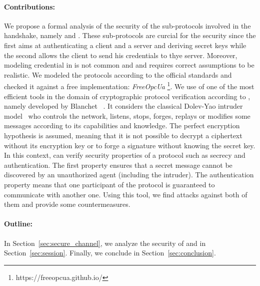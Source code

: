\paragraph{Contributions:}

We propose a formal analysis of the security of
the sub-protocols involved in the \opcua handshake, namely \opcua{}
\securechan and \opcua{} \session. 
These sub-protocols are curcial for the security since the first aims at
authenticating a client and a server and deriving secret keys while the second
allows the client to send his credentials to thye server.
Moreover, modeling credential in \proverif is not common and and requires
correct assumptions to be realistic.
We modeled the protocols according to the official \opcua standards and
checked it against a free implementation: {\em FreeOpcUa}
\footnote{https://freeopcua.github.io/}.
We use of one of the most efficient tools in the domain of
cryptographic protocol verification according to \cite{LP15},
namely \proverif developed by Blanchet \etal~\cite{Bla01}. 
It considers the classical Dolev-Yao intruder model~\cite{DY81} who
controls the network, listens, stops, forges,
replays or modifies some messages according to its capabilities and
knowledge.  The perfect encryption hypothesis is assumed, meaning that
it is not possible to decrypt a ciphertext without its encryption key
or to forge a signature without knowing the secret key.  In this
context, \proverif{} can verify security properties of a protocol such
as secrecy and authentication.  The first property ensures that a
secret message cannot be discovered by an unauthorized agent
(including the intruder).  The authentication property means that one
participant of the protocol is guaranteed to communicate with another
one. Using this tool, we find attacks against both of them and provide
some countermeasures.

\paragraph{Outline:} In Section~\ref{sec:secure_channel}, we analyze the
security of \opcua{} \securechan and \opcua{} \session in
Section~\ref{sec:session}.  Finally, we conclude in
Section~\ref{sec:conclusion}.

